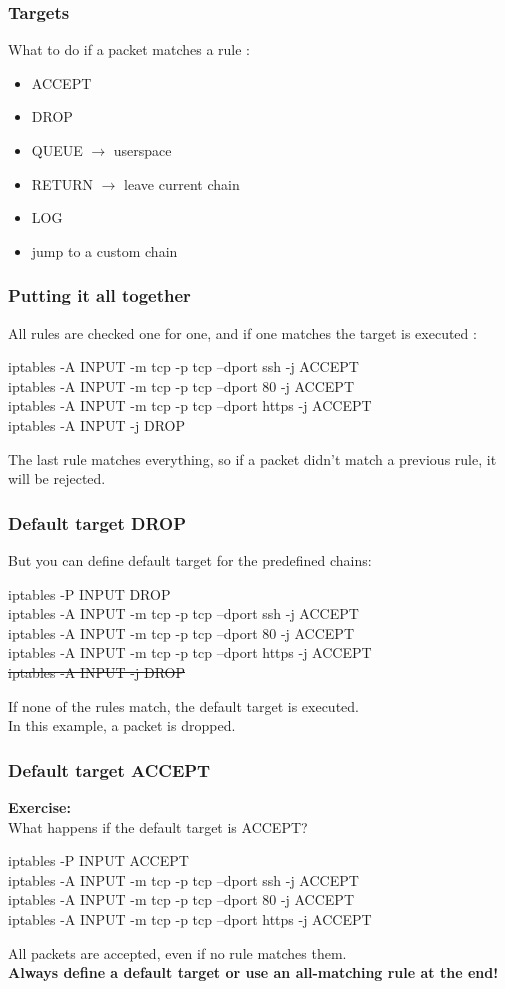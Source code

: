 \documentclass[14pt]{beamer}
\begin{document}
  \begin{frame}
    \frametitle{Targets}
    What to do if a packet matches a rule :
    \begin{itemize}
      \item ACCEPT
      \item DROP
      \item QUEUE $\rightarrow$ userspace
      \item RETURN $\rightarrow$ leave current chain
      \item LOG
      \item jump to a custom chain
    \end{itemize}
  \end{frame}
  \begin{frame}
    \frametitle{Putting it all together}
    All rules are checked one for one, and if one matches the target is executed :
    \begin{example}
      \small{iptables -A INPUT -m tcp -p tcp --dport ssh -j ACCEPT\\
      iptables -A INPUT -m tcp -p tcp --dport 80 -j ACCEPT\\
      iptables -A INPUT -m tcp -p tcp --dport https -j ACCEPT\\
      iptables -A INPUT -j DROP}
    \end{example}
    The last rule matches everything, so if a packet didn't match a previous rule, it will be rejected.
  \end{frame}
  \begin{frame}
    \frametitle{Default target DROP}
    But you can define default target for the predefined chains:
    \begin{example}
      \small{iptables -P INPUT DROP\\
      iptables -A INPUT -m tcp -p tcp --dport ssh -j ACCEPT\\
      iptables -A INPUT -m tcp -p tcp --dport 80 -j ACCEPT\\
      iptables -A INPUT -m tcp -p tcp --dport https -j ACCEPT\\
      \sout{iptables -A INPUT -j DROP}}
    \end{example}
    If none of the rules match, the default target is executed.\\
    In this example, a packet is dropped.
  \end{frame}
  \begin{frame}
    \frametitle{Default target ACCEPT}
    \textbf{Exercise:}\\
    What happens if the default target is ACCEPT?
    \begin{example}
      \small{iptables -P INPUT ACCEPT\\
      iptables -A INPUT -m tcp -p tcp --dport ssh -j ACCEPT\\
      iptables -A INPUT -m tcp -p tcp --dport 80 -j ACCEPT\\
      iptables -A INPUT -m tcp -p tcp --dport https -j ACCEPT}
    \end{example}
    \pause
    All packets are accepted, even if no rule matches them.\\
    \pause
    \textbf{Always define a default target or use an all-matching rule at the end!}
  \end{frame}
\end{document}
